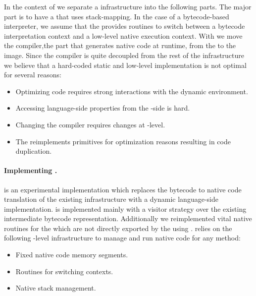 In the context of \NBJ we separate a \JIT infrastructure into the following parts.
The major part is to have a \VM that uses stack-mapping.
In the case of a bytecode-based interpreter, we assume that the \VM provides routines to switch between a bytecode interpretation context and a low-level native execution context.
With \NBJ we move the \JIT compiler,the part that generates native code at runtime, from the \VM to the image.%
 Since the \JIT compiler is quite decoupled from the rest of the \JIT infrastructure we believe that a hard-coded static and low-level implementation is not optimal for several reasons:

\begin{itemize}
	\item Optimizing \PH code requires strong interactions with the dynamic environment.
	\item Accessing language-side properties from the \VM-side is hard.
	\item Changing the \JIT compiler requires changes at \VM-level.
	\item The \JIT reimplements primitives for optimization reasons resulting in code duplication.
\end{itemize}

\paragraph{Implementing \NBJ.}
\NBJ is an experimental \JIT implementation which replaces the bytecode to native code translation of the existing \JIT infrastructure with a dynamic language-side implementation.
\NBJ is implemented mainly with a visitor strategy over the existing intermediate bytecode representation. 
Additionally we reimplemented vital native routines for the \JIT which are not directly exported by the \VM using \B. 
\NBJ relies on the following \VM-level infrastructure to manage and run native code for any \PH method:

\begin{itemize}[noitemsep]
	\item Fixed native code memory segments.
	\item Routines for switching contexts.
	\item Native stack management.
\end{itemize}

